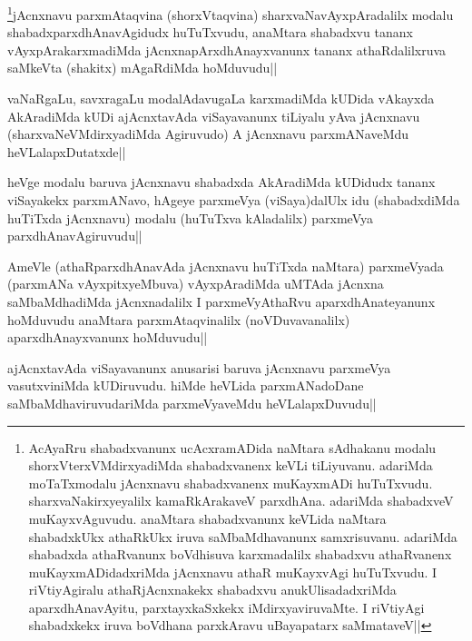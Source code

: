 \begin{artha} 
\footnote[1]{AcAyaRru shabadxvanunx ucAcxramADida naMtara sAdhakanu 
modalu shorxVterxVMdirxyadiMda shabadxvanenx keVLi tiLiyuvanu. 
adariMda moTaTxmodalu jAcnxnavu shabadxvanenx muKayxmADi huTuTxvudu. 
sharxvaNakirxyeyalilx kamaRkArakaveV parxdhAna. adariMda shabadxveV 
muKayxvAguvudu. anaMtara shabadxvanunx keVLida naMtara shabadxkUkx 
athaRkUkx iruva saMbaMdhavanunx samxrisuvanu. adariMda shabadxda 
athaRvanunx boVdhisuva karxmadalilx shabadxvu athaRvanenx 
muKayxmADidadxriMda jAcnxnavu athaR muKayxvAgi huTuTxvudu. I 
riVtiyAgiralu athaRjAcnxnakekx shabadxvu anukUlisadadxriMda 
aparxdhAnavAyitu, parxtayxkaSxkekx iMdirxyaviruvaMte. I riVtiyAgi 
shabadxkekx iruva boVdhana parxkAravu uBayapatarx 
saMmataveV||}jAcnxnavu parxmAtaqvina (shorxVtaqvina) 
sharxvaNavAyxpAradalilx modalu shabadxparxdhAnavAgidudx huTuTxvudu, 
anaMtara shabadxvu tananx vAyxpArakarxmadiMda jAcnxnapArxdhAnayxvanunx 
tananx athaRdalilxruva saMkeVta (shakitx) mAgaRdiMda hoMduvudu||
\end{artha}


\begin{artha} 
vaNaRgaLu, savxragaLu modalAdavugaLa karxmadiMda kUDida vAkayxda 
AkAradiMda kUDi ajAcnxtavAda viSayavanunx tiLiyalu yAva jAcnxnavu 
(sharxvaNeVMdirxyadiMda Agiruvudo) A jAcnxnavu parxmANaveMdu 
heVLalapxDutatxde||
\end{artha}


\begin{artha} 
heVge modalu baruva jAcnxnavu shabadxda AkAradiMda kUDidudx tananx 
viSayakekx parxmANavo, hAgeye parxmeVya (viSaya)dalUlx idu 
(shabadxdiMda huTiTxda jAcnxnavu) modalu (huTuTxva kAladalilx) 
parxmeVya parxdhAnavAgiruvudu||
\end{artha}

\begin{artha} 
AmeVle (athaRparxdhAnavAda jAcnxnavu huTiTxda naMtara) parxmeVyada 
(parxmANa vAyxpitxyeMbuva) vAyxpAradiMda uMTAda jAcnxna saMbaMdhadiMda 
jAcnxnadalilx I parxmeVyAthaRvu aparxdhAnateyanunx hoMduvudu anaMtara 
parxmAtaqvinalilx (noVDuvavanalilx) aparxdhAnayxvanunx hoMduvudu||
\end{artha}

\begin{artha} 
ajAcnxtavAda viSayavanunx anusarisi baruva jAcnxnavu parxmeVya 
vasutxviniMda kUDiruvudu. hiMde heVLida parxmANadoDane 
saMbaMdhaviruvudariMda parxmeVyaveMdu heVLalapxDuvudu||
\end{artha}

